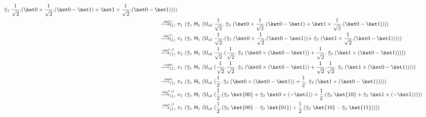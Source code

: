 \documentclass[preprint]{elsarticle}
\newcommand\lra[1][1]{\longrightarrow_{\left(#1\right)}}
\newcommand\pair[2]{({#1}+{#2})}
\newcommand\npair[2]{({#1}-{#2})}
\newcommand\s[1]{\ensuremath{\mathsf{#1}}}
\newcommand\red[2][1]{\overset{\scriptscriptstyle\smash{#2}\vphantom{x}}{\lra[#1]}\ }
\newcommand\rprod{(\s{prod})}
\newcommand\rdists{(\s{\alpha dist})}
\newcommand\rdistcasum{(\s{dist^+_\Uparrow})}
\newcommand\rdistcascal{(\s{dist^\alpha_\Uparrow})}
\newcommand\rdistscall{(\s{dist^\alpha_l})}
\newcommand\rdistsuml{(\s{dist^+_l})}
\begin{document}
\begin{align*}
                 \Uparrow_\ell\frac 1{\sqrt 2}.
                 ( { \ket 0\times\frac 1{\sqrt 2}.\npair{\ket 0}{\ket 1} }
                 + { \ket 1\times\frac 1{\sqrt 2}.\npair{\ket 0}{\ket 1}
                 })))
  \\
  \red\rdistcascal&
                    \pi_1\ (\Uparrow_r \s H_1\ (\s U_{id}\
                    \frac 1{\sqrt 2}.
                    \Uparrow_\ell
                    ( { \ket 0\times\frac 1{\sqrt 2}.\npair{\ket 0}{\ket 1} }
                    + { \ket 1\times\frac 1{\sqrt 2}.\npair{\ket 0}{\ket 1}
                    })))
  \\
  \red\rdistcasum&
                   \pi_1\ (\Uparrow_r \s H_1\ (\s U_{id}\
                   \frac 1{\sqrt 2}.
                   ( \Uparrow_\ell (\ket 0\times\frac 1{\sqrt 2}.\npair{\ket 0}{\ket 1})
                   + \Uparrow_\ell (\ket 1\times\frac
                   1{\sqrt 2}.\npair{\ket 0}{\ket 1}))))
  \\
  \red{\rdistscall^2}&
                       \pi_1\ (\Uparrow_r \s H_1\ (\s U_{id}\
                       \frac 1{\sqrt 2}.
                       ( \frac 1{\sqrt 2}.\Uparrow_\ell (\ket 0\times\npair{\ket 0}{\ket 1})
                       + \frac 1{\sqrt 2}.\Uparrow_\ell
                       (\ket 1\times\npair{\ket 0}{\ket 1}))))
  \\
  \red\rdists&
               \pi_1\ (\Uparrow_r \s H_1\ (\s U_{id}\
               ( \frac 1{\sqrt 2}.  \frac 1{\sqrt 2}.\Uparrow_\ell (\ket 0\times\npair{\ket 0}{\ket 1})
               + \frac 1{\sqrt 2}. \frac 1{\sqrt 2}.\Uparrow_\ell (\ket 1\times\npair{\ket 0}{\ket 1}))))
  \\
  \red{\rprod}&
                \pi_1\ (\Uparrow_r \s H_1\ (\s U_{id}\
                ( \frac 12.\Uparrow_\ell (\ket 0\times\npair{\ket 0}{\ket 1})
                + \frac 12.\Uparrow_\ell (\ket
                1\times\npair{\ket 0}{\ket 1}))))
  \\
  \red{\rdistsuml^2}&
                      \pi_1\ (\Uparrow_r \s H_1\ (\s U_{id}\
                      ( \frac 12.  \pair{\Uparrow_\ell\ket{00}}{\Uparrow_\ell\ket 0\times(-\ket 1)}
                      + \frac 12. \pair{\Uparrow_\ell\ket{10}}{\Uparrow_\ell\ket 1\times(-\ket 1)})))
  \\
  \red{\rdistscall^2}&
                       \pi_1\ (\Uparrow_r \s H_1\ (\s U_{id}\
                       ( \frac 12.  \npair{\Uparrow_\ell\ket{00}}{\Uparrow_\ell\ket{01}}
                       + \frac 12. \npair{\Uparrow_\ell\ket{10}}{\Uparrow_\ell\ket{11}})))
  \\

\end{align*}
\end{document}
